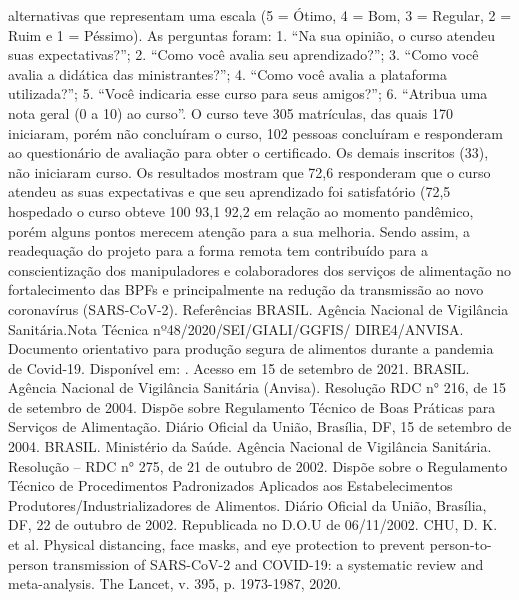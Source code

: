 alternativas que representam uma escala (5 = Ótimo, 4 = Bom, 3 = Regular, 2 = Ruim e 1 = 
Péssimo). As perguntas foram: 1. “Na sua opinião, o curso atendeu suas expectativas?”; 2. “Como 
você avalia seu aprendizado?”; 3. “Como você avalia a didática das ministrantes?”; 4. “Como você 
avalia a plataforma utilizada?”; 5. “Você indicaria esse curso para seus amigos?”; 6. “Atribua uma 
nota geral (0 a 10) ao curso”.
O curso teve 305 matrículas, das quais 170 iniciaram, porém não concluíram o curso, 102 pessoas
concluíram e responderam ao questionário de avaliação para obter o certificado. Os demais 
inscritos (33), não iniciaram curso. Os resultados mostram que 72,6%
responderam que o curso atendeu as suas expectativas e que seu aprendizado foi satisfatório 
(72,5%
hospedado o curso obteve 100%
93,1%
92,2%
em relação ao momento pandêmico, porém alguns pontos merecem atenção para a sua melhoria.
Sendo assim, a readequação do projeto para a forma remota tem contribuído para a conscientização 
dos manipuladores e colaboradores dos serviços de alimentação no fortalecimento das BPFs e 
principalmente na redução da transmissão ao novo coronavírus (SARS-CoV-2).
Referências
BRASIL. Agência Nacional de Vigilância Sanitária.Nota Técnica nº48/2020/SEI/GIALI/GGFIS/
DIRE4/ANVISA. Documento orientativo para produção segura de alimentos durante a pandemia 
de Covid-19. Disponível em: 
. Acesso em 
15 de setembro de 2021.
BRASIL. Agência Nacional de Vigilância Sanitária (Anvisa). Resolução RDC n° 216, de 15
de setembro de 2004. Dispõe sobre Regulamento Técnico de Boas Práticas para Serviços de
Alimentação. Diário Oficial da União, Brasília, DF, 15 de setembro de 2004.
BRASIL. Ministério da Saúde. Agência Nacional de Vigilância Sanitária. Resolução –
RDC n° 275, de 21 de outubro de 2002. Dispõe sobre o Regulamento Técnico de
Procedimentos Padronizados Aplicados aos Estabelecimentos
Produtores/Industrializadores de Alimentos. Diário Oficial da União, Brasília, DF, 22 de
outubro de 2002. Republicada no D.O.U de 06/11/2002.
CHU, D. K. et al. Physical distancing, face masks, and eye protection to prevent person-to-person 
transmission of SARS-CoV-2 and COVID-19: a systematic review and meta-analysis. The Lancet, 
v. 395, p. 1973-1987, 2020. 

